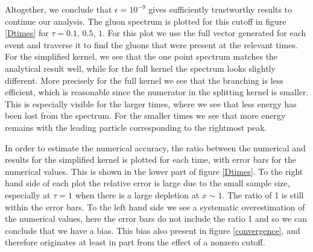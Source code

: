 \documentclass[a4paper,12pt]{article}
\numberwithin{equation}{section}
\begin{document}



Altogether, we conclude that $\epsilon=10^{-9}$ gives sufficiently trustworthy results to continue our analysis.  The gluon spectrum is plotted for this cutoff in figure \ref{Dtimes} for $\tau=0.1,\,0.5,\,1$. For this plot we use the full vector generated for each event and traverse it to find the gluons that were present at the relevant times. For the simplified kernel, we see that the one point spectrum matches the analytical result well, while for the  full kernel the spectrum looks slightly different. More precisely for the full kernel we see that the branching is less efficient, which is reasonable since the numerator in the splitting kernel is smaller. This is especially visible for the larger times, where we see that less energy has been lost from the spectrum. For the smaller times we see that more energy remains with the leading particle corresponding to the rightmost peak.

In order to estimate the numerical accuracy, the ratio between the numerical and results for the simplified kernel is plotted for each time, with error bars for the numerical values. This is shown in the lower part of figure \ref{Dtimes}. To the right hand side of each plot the relative error is large due to the small sample size, especially at $\tau=1$ when there is a large depletion at $x \sim 1$. The ratio of 1 is still within the error bars. To the left hand side we see a systematic overestimation of the numerical values, here the error bars do not include the ratio 1 and so we can conclude that we have a bias. This bias also present in figure \ref{convergence}, and therefore originates at least in part from the effect of a nonzero cutoff.
\end{document}

